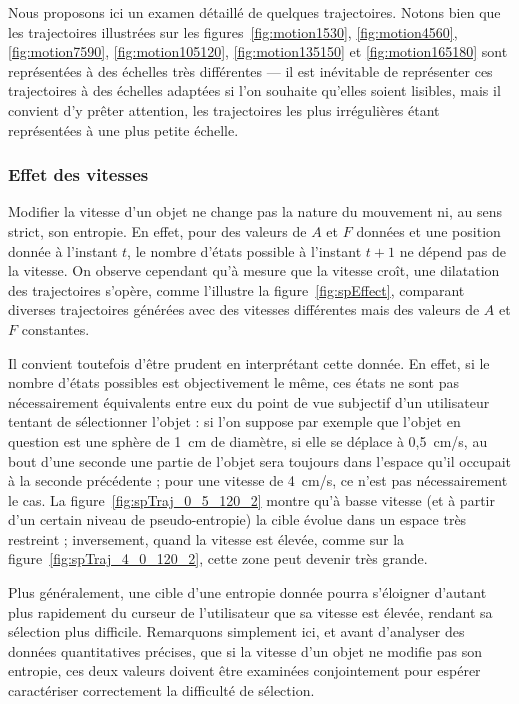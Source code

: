 	Nous proposons ici un examen détaillé de quelques trajectoires. Notons bien que les trajectoires illustrées sur les figures~\ref{fig:motion1530}, \ref{fig:motion4560}, \ref{fig:motion7590}, \ref{fig:motion105120}, \ref{fig:motion135150} et \ref{fig:motion165180} sont représentées à des échelles très différentes --- il est inévitable de représenter ces trajectoires à des échelles adaptées si l'on souhaite qu'elles soient lisibles, mais il convient d'y prêter attention, les trajectoires les plus irrégulières étant représentées à une plus petite échelle.
	
	\subsubsection{Effet des vitesses}
	Modifier la vitesse d'un objet ne change pas la \og nature \fg{} du mouvement ni, au sens strict, son entropie. En effet, pour des valeurs de $A$ et $F$ données et une position donnée à l'instant $t$, le nombre d'états possible à l'instant $t+1$ ne dépend pas de la vitesse. On observe cependant qu'à mesure que la vitesse croît, une \og dilatation \fg{} des trajectoires s'opère, comme l'illustre la figure~\ref{fig:spEffect}, comparant diverses trajectoires générées avec des vitesses différentes mais des valeurs de $A$ et $F$ constantes.
	
	Il convient toutefois d'être prudent en interprétant cette donnée. En effet, si le nombre d'états possibles est objectivement le même, ces états ne sont pas nécessairement équivalents entre eux du point de vue subjectif d'un utilisateur tentant de sélectionner l'objet : si l'on suppose par exemple que l'objet en question est une sphère de 1~cm de diamètre, si elle se déplace à 0,5~cm/s, au bout d'une seconde une partie de l'objet sera toujours dans l'espace qu'il occupait à la seconde précédente ; pour une vitesse de 4~cm/s, ce n'est pas nécessairement le cas. La figure~\ref{fig:spTraj_0_5_120_2} montre qu'à basse vitesse (et à partir d'un certain niveau de pseudo-entropie) la cible évolue dans un espace très restreint ; inversement, quand la vitesse est élevée, comme sur la figure~\ref{fig:spTraj_4_0_120_2}, cette zone peut devenir très grande.
	
	Plus généralement, une cible d'une entropie donnée pourra s'éloigner d'autant plus rapidement du curseur de l'utilisateur que sa vitesse est élevée, rendant sa sélection plus difficile. Remarquons simplement ici, et avant d'analyser des données quantitatives précises, que si la vitesse d'un objet ne modifie pas son entropie, ces deux valeurs doivent être examinées conjointement pour espérer caractériser correctement la difficulté de sélection.	

